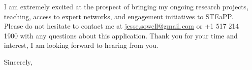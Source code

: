 \documentclass[11pt]{letter}
\begin{document}
\begin{letter}


%
I am extremely excited at the prospect of bringing my ongoing research projects, teaching, access to expert networks, and engagement initiatives to STEaPP.
%
Please do not hesitate to contact me at \href{mailto:jesse.sowell@gmail.com}{jesse.sowell@gmail.com} or +1 517 214 1900 with any questions about this application.
%
Thank you for your time and interest, I am looking forward to hearing from you.

\vspace{\baselineskip}



\closing{Sincerely,}




\end{letter}
\end{document}
